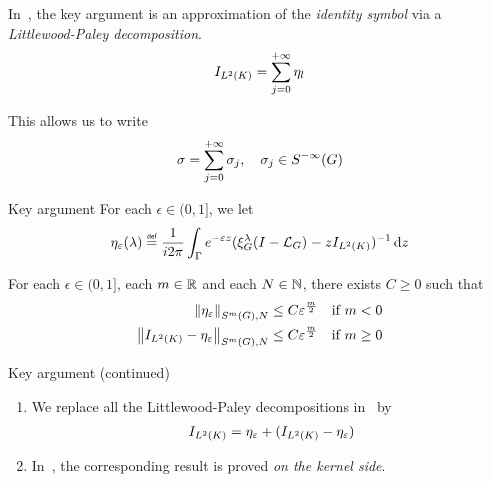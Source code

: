 \documentclass[handout]{beamer}
\begin{document}
\begin{frame}
    In~\cite{Fischer2015,FischerRuzhansky16},
    the key argument is an approximation of the \emph{identity symbol} via a \emph{Littlewood-Paley decomposition}.
    \begin{align*}
        \Id {\Lebesgue 2 \CompactGroup} = \sum_{j = 0}^{+ \infty} \eta_l
    \end{align*}

    This allows us to write
    \begin{align*}
        \sigma = \sum_{j = 0}^{+ \infty} \sigma_j,
        \quad
        \sigma_j \in \SmoothingSymbols
    \end{align*}
\end{frame}

\begin{frame}{Key argument}
    For each $\epsilon \in (0, 1]$,
    we let
    \begin{align*}
        \eta_\epsilon(\lambda)
        \defeq
        \frac 1 {\i \turn}
        \int_\Gamma
        \e^{-\epsilon z}
        (\Rep \lambda \BesselPotentialSquared {} - z \Id {\Lebesgue 2 \CompactGroup})^{-1}
        \dd z
    \end{align*}

    \pause

    \begin{theorem}
        For each $\epsilon \in (0, 1]$, each $m \in \R$ and each $N \in \N$,
        there exists $C \geq 0$ such that
        \begin{align*}
                \SymbolSemiNorm m {} N {\eta_\epsilon}
                &\leq C \epsilon^\frac m 2
                & \text{if } m < 0\\
                \SymbolSemiNorm m {} N {\Id {\Lebesgue 2 \CompactGroup} - \eta_\epsilon}
                &\leq C \epsilon^\frac m 2
                & \text{if } m \geq 0
        \end{align*}
    \end{theorem}
\end{frame}

\begin{frame}{Key argument (continued)}
    \begin{enumerate}
        \item
            We replace all the Littlewood-Paley decompositions in~\cite{Fischer2015,FischerRuzhansky16} by
            \begin{align*}
                \Id {\Lebesgue 2 \CompactGroup}
                =
                \eta_\epsilon +
                (\Id {\Lebesgue 2 \CompactGroup} - \eta_\epsilon)
            \end{align*}
        \item
            In~\cite{FischerRuzhansky16,Fischer2015},
            the corresponding result is proved \emph{on the kernel side}.
    \end{enumerate}
\end{frame}
\end{document}
